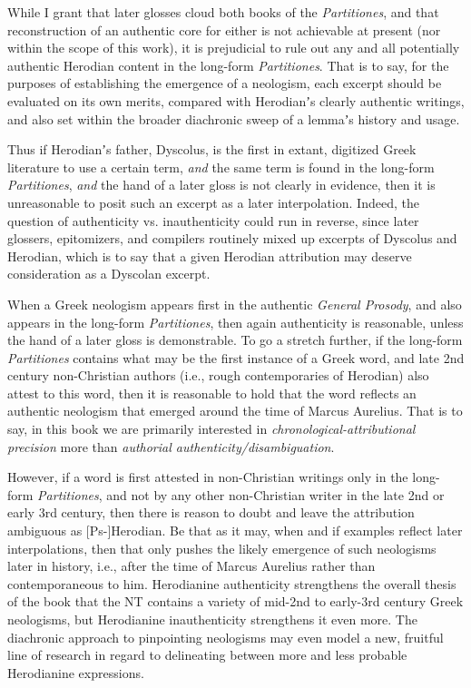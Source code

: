While I grant that later glosses cloud both books of the \textit{Partitiones}, %
and that reconstruction of an authentic core for either is not achievable at present (nor within the scope of this work), %
it is prejudicial to rule out any and all potentially authentic Herodian content in the long-form \textit{Partitiones}. %
That is to say, for the purposes of establishing the emergence of a neologism, %
each excerpt should be evaluated on its own merits, %
compared with Herodianʼs clearly authentic writings, %
and also set within the broader diachronic sweep of a lemmaʼs history and usage. %

Thus if Herodianʼs father, Dyscolus, is the first in extant, digitized Greek literature to use a certain term, %
\textit{and} the same term is found in the long-form \textit{Partitiones}, %
\textit{and} the hand of a later gloss is not clearly in evidence, %
then it is unreasonable to posit such an excerpt as a later interpolation. %
Indeed, the question of authenticity vs. inauthenticity could run in reverse, %
since later glossers, epitomizers, and compilers routinely mixed up excerpts of Dyscolus and Herodian, %
which is to say that a given Herodian attribution may deserve consideration as a Dyscolan excerpt. %

When a Greek neologism appears first in the authentic \textit{General Prosody}, %
and also appears in the long-form \textit{Partitiones}, %
then again authenticity is reasonable, unless the hand of a later gloss is demonstrable. %
To go a stretch further, if the long-form \textit{Partitiones} contains what may be the first instance of a Greek word, %
and late 2nd century non-Christian authors (i.e., rough contemporaries of Herodian) also attest to this word, %
then it is reasonable to hold that the word reflects an authentic neologism that emerged around the time of Marcus Aurelius. %
That is to say, in this book we are primarily interested in \textit{chronological-attributional precision} %
more than \textit{authorial authenticity/disambiguation}. %

However, if a word is first attested in non-Christian writings only in the long-form \textit{Partitiones}, %
and not by any other non-Christian writer in the late 2nd or early 3rd century, %
then there is reason to doubt and leave the attribution ambiguous as [Ps-]Herodian. %
Be that as it may, when and if examples reflect later interpolations, %
then that only pushes the likely emergence of such neologisms later in history, %
i.e., after the time of Marcus Aurelius rather than contemporaneous to him. %
Herodianine authenticity strengthens the overall thesis of the book that the NT %
contains a variety of mid-2nd to early-3rd century Greek neologisms, %
but Herodianine inauthenticity strengthens it even more. %
The diachronic approach to pinpointing neologisms may even model a new, %
fruitful line of research in regard to delineating between more and less probable Herodianine expressions. \\[1.5mm] %

